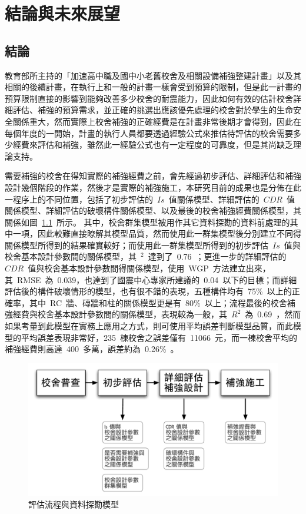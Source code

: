 \renewcommand\thetable{\arabic{chapter}-\arabic{table}}
\chapter{結論與未來展望}
\label{cha:conclusions}

\section{結論}

教育部所主持的「加速高中職及國中小老舊校舍及相關設備補強整建計畫」以及其相關的後續計畫，在執行上和一般的計畫一樣會受到預算的限制，但是此一計畫的預算限制直接的影響到能夠改善多少校舍的耐震能力，因此如何有效的估計校舍詳細評估、補強的預算需求，並正確的挑選出應該優先處理的校舍對於學生的生命安全關係重大，然而實際上校舍補強的正確經費是在計畫非常後期才會得到，因此在每個年度的一開始，計畫的執行人員都要透過經驗公式來推估待評估的校舍需要多少經費來評估和補強，雖然此一經驗公式也有一定程度的可靠度，但是其尚缺乏理論支持。

需要補強的校舍在得知實際的補強經費之前，會先經過初步評估、詳細評估和補強設計幾個階段的作業，然後才是實際的補強施工，本研究目前的成果也是分佈在此一程序上的不同位置，包括了初步評估的~$Is$~值關係模型、詳細評估的~$CDR$~值關係模型、詳細評估的破壞構件關係模型、以及最後的校舍補強經費關係模型，其關係如圖~\ref{fig:FLOW-con}~所示。
其中，校舍群集模型被用作其它資料探勘的資料前處理的其中一項，因此較難直接瞭解其模型品質，然而使用此一群集模型後分別建立不同得關係模型所得到的結果確實較好；而使用此一群集模型所得到的初步評估~$Is$~值與校舍基本設計參數間的關係模型，其~$^2$~達到了~0.76~；更進一步的詳細評估的~$CDR$~值與校舍基本設計參數間得關係模型，使用~WGP~方法建立出來，其~RMSE~為~0.039，也達到了國震中心專家所建議的~0.04~以下的目標；而詳細評估後的構件破壞情形的模型，也有很不錯的表現，五種構件均有~75\%~以上的正確率，其中~RC~牆、磚牆和柱的關係模型更是有~80\%~以上；流程最後的校舍補強經費與校舍基本設計參數間的關係模型，表現較為一般，其~$R^2$~為~0.69~，然而如果考量到此模型在實務上應用之方式，則可使用平均誤差判斷模型品質，而此模型的平均誤差表現非常好，235~棟校舍之誤差僅有~11066~元，而一棟校舍平均的補強經費則高達~400~多萬，誤差約為~0.26\%~。

\begin{figure}[hbtp]
  \begin{center}
    \includegraphics[width=1.0\textwidth]{figures/survey-flow-con.pdf}
    \caption{評估流程與資料探勘模型} 
    \label{fig:FLOW-con}
  \end{center}
\end{figure}

